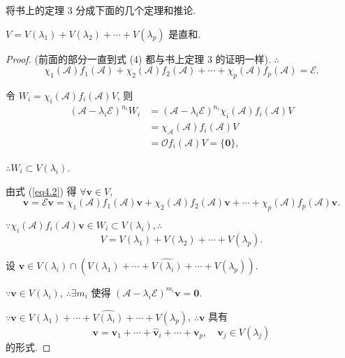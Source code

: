 \documentclass[color=black,device=normal,lang=cn,mode=geye]{elegantnote}
\begin{document}
将书上的定理 3 分成下面的几个定理和推论.
\begin{theorem}\label{t4.2}
    $V=V(\lambda_1)+V(\lambda_2)+\cdots+V(\lambda_p)$ 是直和.
\end{theorem}
\begin{proof}
    (前面的部分一直到式 (4) 都与书上定理 3 的证明一样). $\therefore$
    \begin{equation}\label{eq4.2}
        \chi_1(\mathcal{A})f_1(\mathcal{A})+\chi_2(\mathcal{A})f_2(\mathcal{A})+\cdots+\chi_p(\mathcal{A})f_p(\mathcal{A})=\mathcal{E}.
    \end{equation}

    令 $W_i=\chi_i(\mathcal{A})f_i(\mathcal{A})V$, 则
    \begin{equation}\label{eq4.3}
        \begin{aligned}
            (\mathcal{A}-\lambda_i\mathcal{E})^{n_i}W_i & =(\mathcal{A}-\lambda_i\mathcal{E})^{n_i}\chi_i(\mathcal{A})f_i(\mathcal{A})V \\
            & =\chi_{\mathcal{A}}(\mathcal{A})f_i(\mathcal{A})V \\
            & =\mathcal{O}f_i(\mathcal{A})V=\{\boldsymbol{0}\},
        \end{aligned}
    \end{equation}

    $\therefore W_i\subset V(\lambda_i)$.

    由式 (\ref{eq4.2}) 得 $\forall\boldsymbol{v}\in V$,
    \begin{equation}\label{eq4.4}
        \boldsymbol{v}=\mathcal{E}\boldsymbol{v}=\chi_1(\mathcal{A})f_1(\mathcal{A})\boldsymbol{v}+\chi_2(\mathcal{A})f_2(\mathcal{A})\boldsymbol{v}+\cdots+\chi_p(\mathcal{A})f_p(\mathcal{A})\boldsymbol{v}.
    \end{equation}

    $\because\chi_i(\mathcal{A})f_i(\mathcal{A})\boldsymbol{v}\in W_i\subset V(\lambda_i),\therefore$
    \[V=V(\lambda_1)+V(\lambda_2)+\cdots+V(\lambda_p).\]

    设 $\boldsymbol{v}\in V(\lambda_i)\cap(V(\lambda_1)+\cdots+\widehat{V(\lambda_i)}+\cdots+V(\lambda_p))$.
    
    $\because\boldsymbol{v}\in V(\lambda_i)$, $\therefore\exists m_i$ 使得 $(\mathcal{A}-\lambda_i\mathcal{E})^{m_i}\boldsymbol{v}=\boldsymbol{0}$.

    $\because\boldsymbol{v}\in V(\lambda_1)+\cdots+\widehat{V(\lambda_i)}+\cdots+V(\lambda_p)$, $\therefore\boldsymbol{v}$ 具有
    \[\boldsymbol{v}=\boldsymbol{v}_1+\cdots+\hat{\boldsymbol{v}}_i+\cdots+\boldsymbol{v}_p,\quad\boldsymbol{v}_j\in V(\lambda_j)\]
    的形式.
    

\end{proof}
\end{document}
